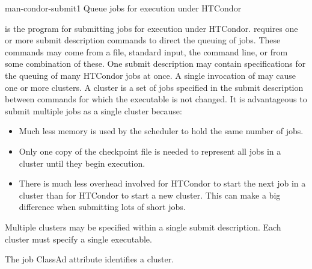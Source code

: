 \begin{ManPage}{}{man-condor-submit}{1}
{Queue jobs for execution under HTCondor}

\Synopsis {}
\ToolDebugOption
\Lbr{}  \Opt{\Dots}\Rbr 
{}

\Description

 is the program for submitting jobs for execution
under HTCondor.
 requires one or more submit description commands
to direct the queuing of jobs. These commands may come from a file,
standard input, the command line, or from some combination of these.
One submit description may contain
specifications for the queuing of many HTCondor jobs at once.
A single invocation of  may cause one or
more clusters.
A cluster is a set of jobs
specified in the submit description
between  commands for which the executable is not changed.
It is advantageous to submit
multiple jobs as a single cluster because:
\begin{itemize}
\item Much less memory is used by the scheduler to hold the same number of jobs.
\item Only one copy of the checkpoint file is needed to 
represent all jobs in a cluster until they begin execution.
\item There is much less overhead involved for HTCondor to start the next
job in a cluster than for HTCondor to start a new cluster.  This can make
a big difference when submitting lots of short jobs.
\end{itemize}

Multiple clusters may be specified within a single
submit description.
Each cluster must specify a single executable.

The job ClassAd attribute  identifies a cluster.


\end{ManPage}
